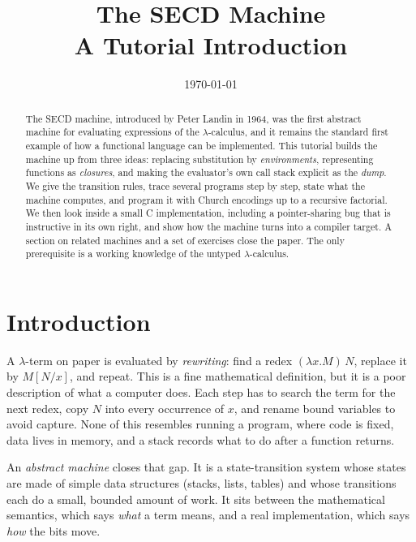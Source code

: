 \documentclass[11pt,a4paper]{article}
\title{The SECD Machine\\[4pt]\large A Tutorial Introduction}
\author{}
\date{\today}
\theoremstyle{definition}
\theoremstyle{plain}
\begin{document}
\maketitle

\begin{abstract}
\noindent
The SECD machine, introduced by Peter Landin in 1964, was the first abstract
machine for evaluating expressions of the $\lambda$-calculus, and it remains the
standard first example of how a functional language can be implemented.
This tutorial builds the machine up from three ideas: replacing substitution by
\emph{environments}, representing functions as \emph{closures}, and making the
evaluator's own call stack explicit as the \emph{dump}.
We give the transition rules, trace several programs step by step, state what
the machine computes, and program it with Church encodings up to a recursive
factorial. We then look inside a small C implementation, including a
pointer-sharing bug that is instructive in its own right, and show how the
machine turns into a compiler target. A section on related machines and a set
of exercises close the paper. The only prerequisite is a working knowledge of
the untyped $\lambda$-calculus.
\end{abstract}

\tableofcontents

\section{Introduction}

A $\lambda$-term on paper is evaluated by \emph{rewriting}: find a redex
$(\lambda x.M)\,N$, replace it by $M[N/x]$, and repeat. This is a fine
mathematical definition, but it is a poor description of what a computer does.
Each step has to search the term for the next redex, copy $N$ into every
occurrence of $x$, and rename bound variables to avoid capture. None of this
resembles running a program, where code is fixed, data lives in memory, and a
stack records what to do after a function returns.

An \emph{abstract machine} closes that gap. It is a state-transition system whose
states are made of simple data structures (stacks, lists, tables) and whose
transitions each do a small, bounded amount of work. It sits between the
mathematical semantics, which says \emph{what} a term means, and a real
implementation, which says \emph{how} the bits move.
\end{document}
